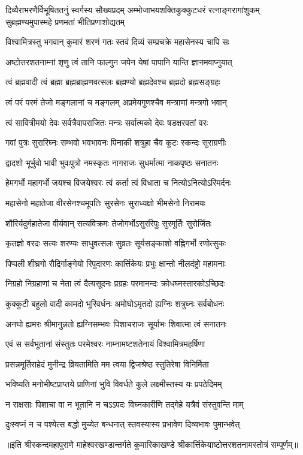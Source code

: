 
{दिव्यैराभरणैर्विभूषिततनुं स्वर्गस्य सौख्यप्रदम्}
{अम्भोजाभयशक्तिकुक्कुटधरं रत्नाङ्गरागांशुकम्}
{सुब्रह्मण्यमुपास्महे प्रणमतां भीतिप्रणाशोद्यतम्}

\twolineshloka
{विश्वामित्रस्तु भगवान् कुमारं शरणं गतः}
{स्तवं दिव्यं सम्प्रचक्रे महासेनस्य चापि सः}

\twolineshloka
{अष्टोत्तरशतनाम्नां शृणु त्वं तानि फाल्गुन}
{जपेन येषां पापानि यान्ति ज्ञानमवाप्नुयात्}

\twolineshloka
{त्वं ब्रह्मवादी त्वं ब्रह्मा ब्रह्मब्राह्मणवत्सलः}
{ब्रह्मण्यो ब्रह्मदेवश्च ब्रह्मदो ब्रह्मसङ्ग्रहः}

\twolineshloka
{त्वं परं परमं तेजो मङ्गलानां च मङ्गलम्}
{अप्रमेयगुणश्चैव मन्त्राणां मन्त्रगो भवान्}

\twolineshloka
{त्वं सावित्रीमयो देवः सर्वत्रैवापराजितः}
{मन्त्रः सर्वात्मको देवः षडक्षरवतां वरः}

\twolineshloka
{गवां पुत्रः सुरारिघ्नः सम्भवो भवभावनः}
{पिनाकी शत्रुहा चैव कूटः स्कन्दः सुराग्रणीः}

\twolineshloka
{द्वादशो भूर्भुवो भावी भुवःपुत्रो नमस्कृतः}
{नागराजः सुधर्मात्मा नाकपृष्ठः सनातनः}

\twolineshloka
{हेमगर्भो महागर्भो जयश्च विजयेश्वरः}
{त्वं कर्ता त्वं विधाता च नित्योऽनित्योऽरिमर्दनः}

\twolineshloka
{महासेनो महातेजा वीरसेनश्चमूपतिः}
{सुरसेनः सुराध्यक्षो भीमसेनो निरामयः}

\twolineshloka
{शौरिर्यदुर्महातेजा वीर्यवान् सत्यविक्रमः}
{तेजोगर्भोऽसुररिपुः सुरमूर्तिः सुरोर्जितः}

\twolineshloka
{कृतज्ञो वरदः सत्यः शरण्यः साधुवत्सलः}
{सुव्रतः सूर्यसङ्काशो वह्निगर्भो रणोत्सुकः}

\twolineshloka
{पिप्पली शीघ्रगो रौद्रिर्गाङ्गेयो रिपुदारणः}
{कार्त्तिकेयः प्रभुः क्षान्तो नीलदंष्ट्रो महामनाः}

\twolineshloka
{निग्रहो निग्रहाणां च नेता त्वं दैत्यसूदनः}
{प्रग्रहः परमानन्दः क्रोधघ्नस्तारकोऽच्छिदः}

\twolineshloka
{कुक्कुटी बहुलो वादी कामदो भूरिवर्धनः}
{अमोघोऽमृतदो ह्यग्निः शत्रुघ्नः सर्वबोधनः}

\twolineshloka
{अनघो ह्यमरः श्रीमानुन्नतो ह्यग्निसम्भवः}
{पिशाचराजः सूर्याभः शिवात्मा त्वं सनातनः}

\twolineshloka
{एवं स सर्वभूतानां संस्तुतः परमेश्वरः}
{नाम्नामष्टशतेनायं विश्वामित्रमहर्षिणा}

\twolineshloka
{प्रसन्नमूर्तिराहेदं मुनीन्द्र व्रियतामिति}
{मम त्वया द्विजश्रेष्ठ स्तुतिरेषा विनिर्मिता}

\twolineshloka
{भविष्यति मनोभीष्टप्राप्तये प्राणिनां भुवि}
{विवर्धते कुले लक्ष्मीस्तस्य यः प्रपठेदिमम्}

\twolineshloka
{न राक्षसाः पिशाचा वा न भूतानि न चऽऽपदः}
{विघ्नकारीणि तद्गेहे यत्रैवं संस्तुवन्ति माम्}

\twolineshloka
{दुःस्वप्नं न च पश्येत्स बद्धो मुच्येत बन्धनात्}
{स्तवस्यास्य प्रभावेण दिव्यभावः पुमान्भवेत्}

{॥इति श्रीस्कन्दमहापुराणे माहेश्वरखण्डान्तर्गते कुमारिकाखण्डे श्रीकार्त्तिकेयाष्टोत्तरशतनामस्तोत्रं सम्पूर्णम्॥}